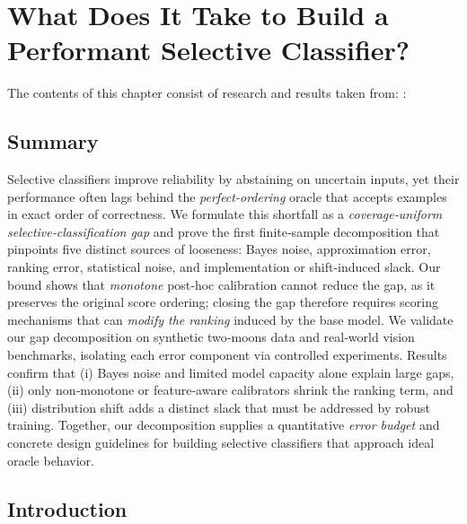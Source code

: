 \newcommand{\E}{\mathbb{E}}
\newcommand{\R}{\mathbb{R}}

\chapter{What Does It Take to Build a Performant Selective Classifier?}
\label{ch:sc_bounds}

\begin{paperref}
\normalfont
The contents of this chapter consist of research and results taken from: \citet{rabanser2025what}: \emph{}
\end{paperref}

\section*{Summary}

Selective classifiers improve reliability by abstaining on uncertain inputs, yet their performance often lags behind the \emph{perfect-ordering} oracle that accepts examples in exact order of correctness. We formulate this shortfall as a \emph{coverage‑uniform selective‑classification gap} and prove the first finite‑sample decomposition that pinpoints five distinct sources of looseness: Bayes noise, approximation error, ranking error, statistical noise, and implementation or shift‑induced slack. Our bound shows that \emph{monotone} post‑hoc calibration cannot reduce the gap, as it preserves the original score ordering; closing the gap therefore requires scoring mechanisms that can \emph{modify the ranking} induced by the base model. We validate our gap decomposition on synthetic two‐moons data and real‐world vision benchmarks, isolating each error component via controlled experiments. Results confirm that (i) Bayes noise and limited model capacity alone explain large gaps, (ii) only non‑monotone or feature‑aware calibrators shrink the ranking term, and (iii) distribution shift adds a distinct slack that must be addressed by robust training. Together, our decomposition supplies a quantitative \emph{error budget} and concrete design guidelines for building selective classifiers that approach ideal oracle behavior.

\section{Introduction}
\label{sec:intro}

